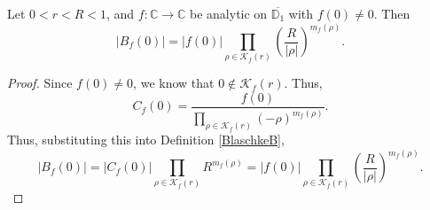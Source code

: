 \begin{lemma}[BlaschkeOfZero]
\label{BlaschkeOfZero}
\leanok
Let $0 < r < R<1$, and $f:\mathbb{C}\to\mathbb{C}$ be analytic on $\overline{\mathbb{D}_1}$ with
    $f(0)\neq 0$. Then
    $$|B_f(0)|=|f(0)|\prod_{\rho\in\mathcal{K}_f(r)}
      \left(\frac{R}{|\rho|}\right)^{m_f(\rho)}.$$
\end{lemma}
\begin{proof}
\leanok
Since $f(0)\neq 0$, we know that $0\not\in\mathcal{K}_f(r)$. Thus,
    $$C_f(0)=\frac{f(0)}{\displaystyle\prod_{\rho\in\mathcal{K}_f(r)}(-\rho)^{m_f(\rho)}}.$$
    Thus, substituting this into Definition \ref{BlaschkeB},
    $$|B_f(0)|=|C_f(0)|\prod_{\rho\in\mathcal{K}_f(r)}R^{m_f(\rho)}
      =|f(0)|\prod_{\rho\in\mathcal{K}_f(r)}\left(\frac{R}{|\rho|}\right)^{m_f(\rho)}.$$
\end{proof}

